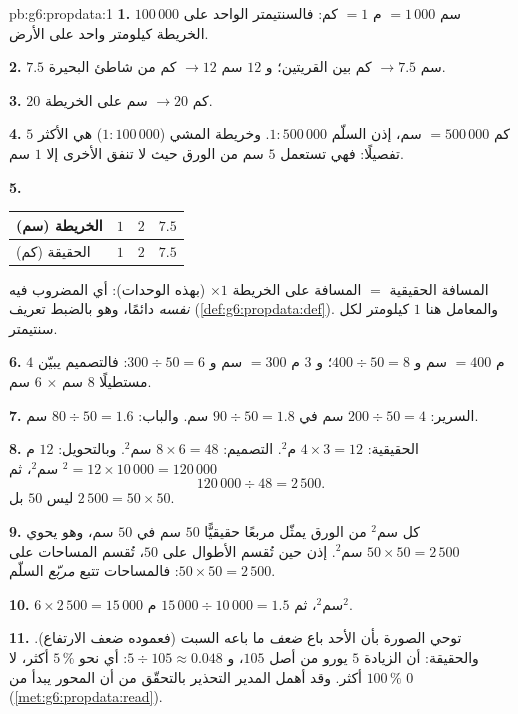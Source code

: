 \begin{solution}{pb:g6:propdata:1}
\textbf{1.} $100\,000$ سم $= 1\,000$ م $= 1$ كم: فالسنتيمتر الواحد
على الخريطة كيلومتر واحد على الأرض.

\textbf{2.} $7.5$ سم $\rightarrow 7.5$ كم بين القريتين؛
و $12$ سم $\rightarrow 12$ كم من شاطئ البحيرة.

\textbf{3.} $20$ كم $\rightarrow 20$ سم على الخريطة.

\textbf{4.} $5$ كم $= 500\,000$ سم، إذن السلّم
$1:500\,000$. وخريطة المشي ($1:100\,000$) هي الأكثر
تفصيلًا: فهي تستعمل $5$ سم من الورق حيث لا تنفق الأخرى إلا
$1$ سم.

\textbf{5.}
\begin{center}
\renewcommand{\arraystretch}{1.2}
\begin{tabular}{l|ccc}
الخريطة (سم) & $1$ & $2$ & $7.5$ \\
\hline
الحقيقة (كم) & $1$ & $2$ & $7.5$ \\
\end{tabular}
\end{center}
المسافة الحقيقية $=$ المسافة على الخريطة $\times 1$ (بهذه الوحدات):
أي المضروب فيه \emph{نفسه} دائمًا، وهو بالضبط
تعريف 
(\cref{def:g6:propdata:def}). والمعامل هنا $1$
كيلومتر لكل سنتيمتر.

\textbf{6.} $4$ م $= 400$ سم و $400 \div 50 = 8$؛
و $3$ م $= 300$ سم و $300 \div 50 = 6$: فالتصميم يبيّن مستطيلًا
$8$ سم $\times$ $6$ سم.

\textbf{7.} السرير: $200 \div 50 = 4$ سم في $90 \div 50 = 1.8$ سم.
والباب: $80 \div 50 = 1.6$ سم.

\textbf{8.}  الحقيقية: $4 \times 3 = 12$ م$^2$.  التصميم:
$8 \times 6 = 48$ سم$^2$. وبالتحويل:
$12$ م$^2 = 12 \times 10\,000 = 120\,000$ سم$^2$، ثم
\[
120\,000 \div 48 = 2\,500 .
\]
 ليس $50$ بل $2\,500 = 50 \times 50$.

\textbf{9.} كل سم$^2$ من الورق يمثّل مربعًا حقيقيًّا
$50$ سم في $50$ سم، وهو يحوي
$50 \times 50 = 2\,500$ سم$^2$. إذن حين تُقسم الأطوال على
$50$، تُقسم المساحات على $50 \times 50 = 2\,500$: فالمساحات تتبع
\emph{مربّع} السلّم.

\textbf{10.} $6 \times 2\,500 = 15\,000$ سم$^2$، ثم
$15\,000 \div 10\,000 = 1.5$ م$^2$.

\textbf{11.} توحي الصورة بأن الأحد باع \emph{ضعف} ما
باعه السبت (فعموده ضعف الارتفاع). والحقيقة: أن الزيادة $5$ يورو من
أصل $105$، و $5 \div 105 \approx 0.048$: أي نحو $5\,\%$ أكثر،
لا $100\,\%$ أكثر. وقد أهمل المدير التحذير بالتحقّق
من أن المحور يبدأ من $0$
(\cref{met:g6:propdata:read}).


\end{solution}
